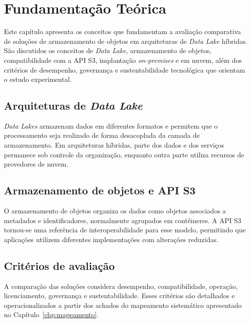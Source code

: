 \chapter{Fundamentação Teórica}
\label{chp:fundamentacao}

Este capítulo apresenta os conceitos que fundamentam a avaliação comparativa de
soluções de armazenamento de objetos em arquiteturas de \textit{Data Lake}
híbridas. São discutidos os conceitos de \textit{Data Lake}, armazenamento de
objetos, compatibilidade com a API S3, implantação \textit{on-premises} e em
nuvem, além dos critérios de desempenho, governança e sustentabilidade
tecnológica que orientam o estudo experimental.

\section{Arquiteturas de \textit{Data Lake}}

\textit{Data Lakes} armazenam dados em diferentes formatos e permitem que o
processamento seja realizado de forma desacoplada da camada de armazenamento.
Em arquiteturas híbridas, parte dos dados e dos serviços permanece sob controle
da organização, enquanto outra parte utiliza recursos de provedores de nuvem.

\section{Armazenamento de objetos e API S3}

O armazenamento de objetos organiza os dados como objetos associados a
metadados e identificadores, normalmente agrupados em contêineres. A API S3
tornou-se uma referência de interoperabilidade para esse modelo, permitindo que
aplicações utilizem diferentes implementações com alterações reduzidas.

\section{Critérios de avaliação}

A comparação das soluções considera desempenho, compatibilidade, operação,
licenciamento, governança e sustentabilidade. Esses critérios são detalhados e
operacionalizados a partir dos achados do mapeamento sistemático apresentado no
Capítulo~\ref{chp:mapeamento}.
